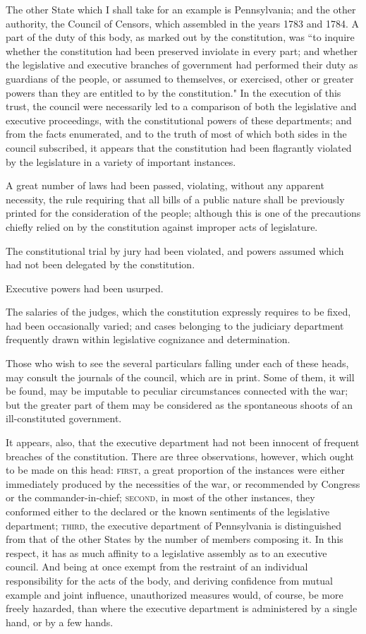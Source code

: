 The other State which I shall take for an example is Pennsylvania; and the other authority, the Council of Censors, which assembled in the years 1783 and 1784. 
A part of the duty of this body, as marked out by the constitution, was ``to inquire whether the constitution had been preserved inviolate in every part; and whether the legislative and executive branches of government had performed their duty as guardians of the people, or assumed to themselves, or exercised, other or greater powers than they are entitled to by the constitution." In the execution of this trust, the council were necessarily led to a comparison of both the legislative and executive proceedings, with the constitutional powers of these departments; and from the facts enumerated, and to the truth of most of which both sides in the council subscribed, it appears that the constitution had been flagrantly violated by the legislature in a variety of important instances.

A great number of laws had been passed, violating, without any apparent necessity, the rule requiring that all bills of a public nature shall be previously printed for the consideration of the people; although this is one of the precautions chiefly relied on by the constitution against improper acts of legislature.

The constitutional trial by jury had been violated, and powers assumed which had not been delegated by the constitution.

Executive powers had been usurped.

The salaries of the judges, which the constitution expressly requires to be fixed, had been occasionally varied; and cases belonging to the judiciary department frequently drawn within legislative cognizance and determination.

Those who wish to see the several particulars falling under each of these heads, may consult the journals of the council, which are in print. 
Some of them, it will be found, may be imputable to peculiar circumstances connected with the war; but the greater part of them may be considered as the spontaneous shoots of an ill-constituted government.

It appears, also, that the executive department had not been innocent of frequent breaches of the constitution. 
There are three observations, however, which ought to be made on this head: \textsc{first}, a great proportion of the instances were either immediately produced by the necessities of the war, or recommended by Congress or the commander-in-chief; \textsc{second}, in most of the other instances, they conformed either to the declared or the known sentiments of the legislative department; \textsc{third}, the executive department of Pennsylvania is distinguished from that of the other States by the number of members composing it. 
In this respect, it has as much affinity to a legislative assembly as to an executive council. 
And being at once exempt from the restraint of an individual responsibility for the acts of the body, and deriving confidence from mutual example and joint influence, unauthorized measures would, of course, be more freely hazarded, than where the executive department is administered by a single hand, or by a few hands.

